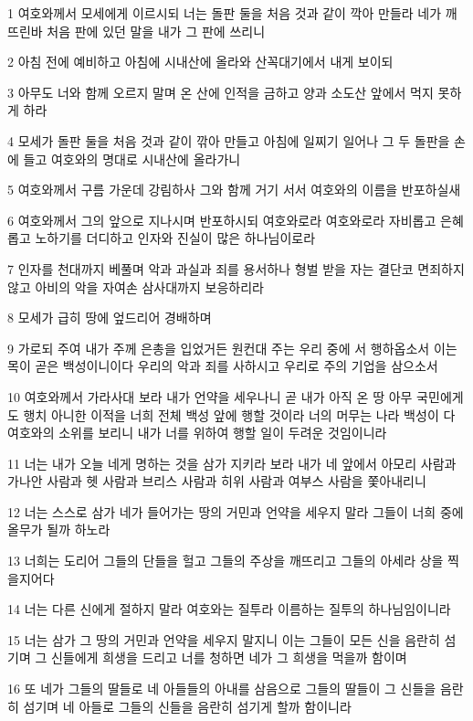\par 1 여호와께서 모세에게 이르시되 너는 돌판 둘을 처음 것과 같이 깍아 만들라 네가 깨뜨린바 처음 판에 있던 말을 내가 그 판에 쓰리니
\par 2 아침 전에 예비하고 아침에 시내산에 올라와 산꼭대기에서 내게 보이되
\par 3 아무도 너와 함께 오르지 말며 온 산에 인적을 금하고 양과 소도산 앞에서 먹지 못하게 하라
\par 4 모세가 돌판 둘을 처음 것과 같이 깎아 만들고 아침에 일찌기 일어나 그 두 돌판을 손에 들고 여호와의 명대로 시내산에 올라가니
\par 5 여호와께서 구름 가운데 강림하사 그와 함께 거기 서서 여호와의 이름을 반포하실새
\par 6 여호와께서 그의 앞으로 지나시며 반포하시되 여호와로라 여호와로라 자비롭고 은혜롭고 노하기를 더디하고 인자와 진실이 많은 하나님이로라
\par 7 인자를 천대까지 베풀며 악과 과실과 죄를 용서하나 형벌 받을 자는 결단코 면죄하지 않고 아비의 악을 자여손 삼사대까지 보응하리라
\par 8 모세가 급히 땅에 엎드리어 경배하며
\par 9 가로되 주여 내가 주께 은총을 입었거든 원컨대 주는 우리 중에 서 행하옵소서 이는 목이 곧은 백성이니이다 우리의 악과 죄를 사하시고 우리로 주의 기업을 삼으소서
\par 10 여호와께서 가라사대 보라 내가 언약을 세우나니 곧 내가 아직 온 땅 아무 국민에게도 행치 아니한 이적을 너희 전체 백성 앞에 행할 것이라 너의 머무는 나라 백성이 다 여호와의 소위를 보리니 내가 너를 위하여 행할 일이 두려운 것임이니라
\par 11 너는 내가 오늘 네게 명하는 것을 삼가 지키라 보라 내가 네 앞에서 아모리 사람과 가나안 사람과 헷 사람과 브리스 사람과 히위 사람과 여부스 사람을 쫓아내리니
\par 12 너는 스스로 삼가 네가 들어가는 땅의 거민과 언약을 세우지 말라 그들이 너희 중에 올무가 될까 하노라
\par 13 너희는 도리어 그들의 단들을 헐고 그들의 주상을 깨뜨리고 그들의 아세라 상을 찍을지어다
\par 14 너는 다른 신에게 절하지 말라 여호와는 질투라 이름하는 질투의 하나님임이니라
\par 15 너는 삼가 그 땅의 거민과 언약을 세우지 말지니 이는 그들이 모든 신을 음란히 섬기며 그 신들에게 희생을 드리고 너를 청하면 네가 그 희생을 먹을까 함이며
\par 16 또 네가 그들의 딸들로 네 아들들의 아내를 삼음으로 그들의 딸들이 그 신들을 음란히 섬기며 네 아들로 그들의 신들을 음란히 섬기게 할까 함이니라
